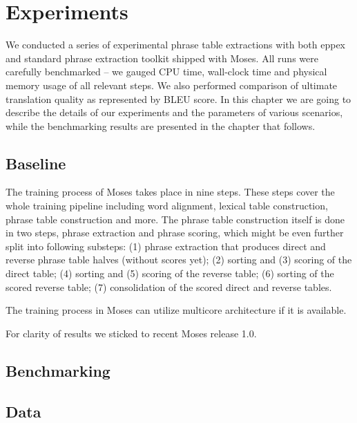 
\chapter{Experiments}
\label{chap:experiments}

We conducted a series of experimental phrase table extractions with both eppex and
standard phrase extraction toolkit shipped with Moses.
All runs were carefully benchmarked -- we gauged CPU time, wall-clock time and
physical memory usage of all relevant steps.
We also performed comparison of ultimate translation quality as represented by BLEU score.
In this chapter we are going to describe the details of our experiments and
the parameters of various scenarios,
while the benchmarking results are presented in the chapter that follows.

\section{Baseline}

The training process of Moses takes place in nine steps.
These steps cover the whole training pipeline including word alignment, lexical table construction,
phrase table construction and more. The phrase table construction itself is done in two steps,
phrase extraction and phrase scoring, which might be even further split into following
substeps: (1) phrase extraction that produces direct and reverse phrase table halves
(without scores yet); (2) sorting and (3) scoring of the direct table; (4)
sorting and (5) scoring of the reverse table; (6) sorting of the scored
reverse table; (7) consolidation of the scored direct and reverse tables.

The training process in Moses can utilize multicore architecture if it is available.

For clarity of results we sticked to recent Moses release 1.0.

\section{Benchmarking}


\section{Data}

